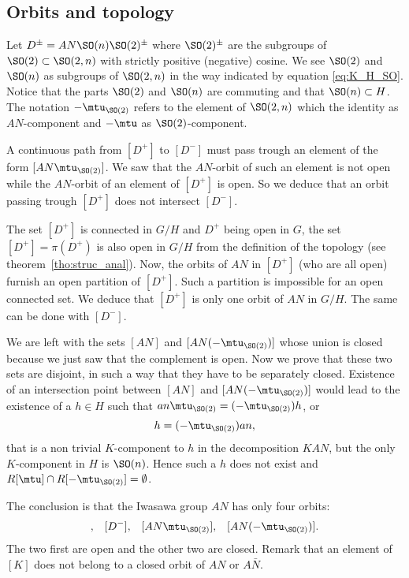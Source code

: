\subsection{Orbits  and topology}
\label{PgTopoOrb}

Let  $D^{\pm}=AN\SO(n)\SO(2)^{\pm}$ where $\SO(2)^{\pm}$ are the subgroups of $\SO(2)\subset \SO(2,n)$ with strictly positive (negative) cosine. We see $\SO(2)$ and $\SO(n)$ as subgroups of $\SO(2,n)$ in the way indicated by equation \eqref{eq:K_H_SO}. Notice that the parts $\SO(2)$ and $\SO(n)$ are commuting and that $\SO(n)\subset H$. The notation $-\mtu_{\SO(2)}$ refers to the element of $\SO(2,n)$ which the identity as $AN$-component and $-\mtu$ as $\SO(2)$-component.

A continuous path from $[D^+]$ to $[D^-]$ must pass trough an element of the form $[AN\mtu_{\SO(2)}]$. We saw that the $AN$-orbit of such an element is not open while the $AN$-orbit of an element of $[D^+]$ is open. So we deduce that an orbit passing trough $[D^+]$ does not intersect $[D^-]$.

The set $[D^+]$ is connected in $G/H$ and $D^+$  being open in $G$, the set $[D^+]=\pi(D^+)$ is also open in $G/H$ from the definition of the topology (see theorem~\ref{tho:struc_anal}). Now, the orbits of $AN$ in $[D^+]$ (who are all open) furnish an open partition of $[D^+]$. Such a partition is impossible for an open connected set. We deduce that $[D^+]$ is only one orbit of $AN$ in $G/H$. The same can be done with $[D^-]$.

We are left with the sets $[AN]$ and $[AN(-\mtu_{\SO(2)})]$ whose union is closed because we just saw that the complement is open. Now we prove that these two sets are disjoint, in such a way that they have to be separately closed. Existence of an intersection point between $[AN]$ and $[AN(-\mtu_{\SO(2)})]$ would lead to the existence of a $h\in H$ such that $an\mtu_{\SO(2)}=(-\mtu_{\SO(2)})h$, or
\[
  h=(-\mtu_{\SO(2)})an,
\]
that is a non trivial $K$-component to $h$ in the decomposition $KAN$, but the only $K$-component in $H$ is $\SO(n)$. Hence such a $h$ does not exist and $R[\mtu]\cap R[-\mtu_{\SO(2)}]=\emptyset$.

The conclusion is that the Iwasawa group $AN$ has only four orbits:
\begin{align}
[D^+],&&[D^-],&&[AN\mtu_{\SO(2)}],&&[AN(-\mtu_{\SO(2)})].
\end{align}
The two first are open and the other two are closed. Remark\label{PgNoticeKpassung} that an element of $[K]$ does not belong to a closed orbit of $AN$ or $A\bar N$.


